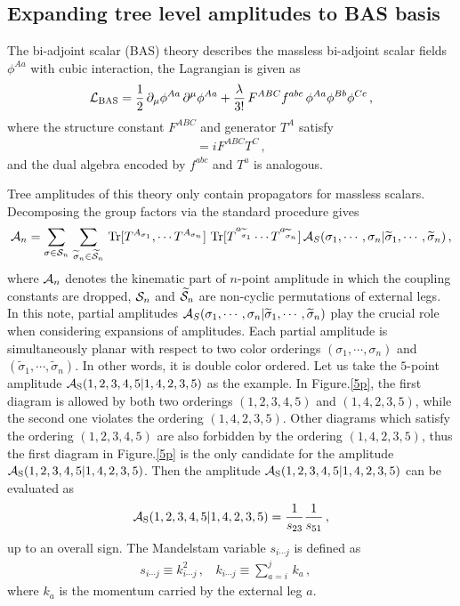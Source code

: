 \documentclass[preprint,showpacs,onecolumn,nofootinbib]{revtex4}
\newcommand{\bea}{\begin{eqnarray}}
\newcommand{\eea}{\end{eqnarray}}
\def\W #1{\widetilde{#1}}
\def\Tr{\mathop{\rm Tr}}
\begin{document}
\subsection{Expanding tree level amplitudes to BAS basis}
\label{subsecexpand}

The bi-adjoint scalar (BAS) theory describes the massless bi-adjoint scalar fields $\phi^{Aa}$ with cubic interaction, the Lagrangian is given as
%
\bea
{\cal L}_{\rm BAS}={1\over2}\,\partial_\mu\phi^{Aa}\,\partial^{\mu}\phi^{Aa}+{\lambda\over3!}\,F^{ABC}f^{abc}\,
\phi^{Aa}\phi^{Bb}\phi^{Cc}\,,
\eea
%
where the structure constant $F^{ABC}$ and generator $T^A$ satisfy
%
\bea
[T^A,T^B]=iF^{ABC}T^C\,,
\eea
%
and the dual algebra encoded by $f^{abc}$ and $T^{a}$ is analogous.

Tree amplitudes of this theory only contain propagators for massless scalars. Decomposing the group factors via the standard procedure gives
%
\bea
{\cal A}_n=\sum_{\sigma\in{\cal S}_n}\,\sum_{\W\sigma_n\in\W{\cal S}_n}\,\Tr[T^{A_{\sigma_1}},\cdots T^{A_{\sigma_n}}]\,\Tr[T^{a_{\W\sigma_1}}\cdots T^{a_{\W\sigma_n}}]\,{\cal A}_{S}(\sigma_1,\cdots,\sigma_n|\W\sigma_1,\cdots,\W\sigma_n)\,,
\eea
%
where ${\cal A}_n$ denotes the kinematic part of $n$-point amplitude in which the coupling constants are dropped, ${\cal S}_n$ and $\W{\cal S}_n$ are non-cyclic permutations of external legs. In this note, partial amplitudes ${\cal A}_{S}(\sigma_1,\cdots,\sigma_n|\W\sigma_1,\cdots,\W\sigma_n)$ play the crucial role when considering expansions of amplitudes.
Each partial amplitude is simultaneously planar with respect to two color orderings $(\sigma_1,\cdots,\sigma_n)$ and $(\W\sigma_1,\cdots,\W\sigma_n)$. In other words, it is double color ordered. Let us take the $5$-point amplitude ${\cal A}_{\rm S}(1,2,3,4,5|1,4,2,3,5)$ as the example.
In Figure.\ref{5p}, the first diagram is allowed by both two orderings $(1,2,3,4,5)$ and $(1,4,2,3,5)$, while the second one violates the ordering
$(1,4,2,3,5)$. Other diagrams which satisfy the ordering $(1,2,3,4,5)$ are also forbidden by the ordering $(1,4,2,3,5)$, thus the first diagram in Figure.\ref{5p} is the only candidate for the amplitude
${\cal A}_{\rm S}(1,2,3,4,5|1,4,2,3,5)$. Then the amplitude ${\cal A}_{\rm S}(1,2,3,4,5|1,4,2,3,5)$ can be evaluated as
%
\bea
{\cal A}_{\rm S}(1,2,3,4,5|1,4,2,3,5)={1\over s_{23}}{1\over s_{51}}\,,
\eea
%
up to an overall sign. The Mandelstam variable $s_{i\cdots j}$ is defined as
%
\bea
s_{i\cdots j}\equiv k_{i\cdots j}^2\,,~~~~k_{i\cdots j}\equiv\sum_{a=i}^j\,k_a\,,~~~~\label{mandelstam}
\eea
%
where $k_a$ is the momentum carried by the external leg $a$.
\end{document}
